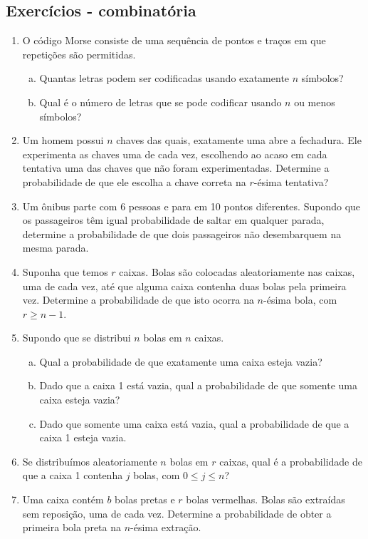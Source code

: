 \documentclass[../Notas.tex]{subfiles}
\begin{document}
\subsection{Exercícios - combinatória}

\begin{enumerate}
    \item O código Morse consiste de uma sequência de pontos e traços em que repetições são permitidas.
    \begin{enumerate}[a)]
    \item Quantas letras podem ser codificadas usando exatamente $n$ símbolos?
    \item Qual é o número de letras que se pode codificar usando $n$ ou menos símbolos?
    \end{enumerate}
    \item Um homem possui $n$ chaves das quais, exatamente uma abre a fechadura. Ele experimenta as chaves uma de cada vez, escolhendo ao acaso em cada tentativa uma das chaves que não foram experimentadas. Determine a probabilidade de que ele escolha a chave correta na $r$-ésima tentativa?
    \item Um ônibus parte com 6 pessoas e para em 10 pontos diferentes. Supondo que os passageiros têm igual probabilidade de saltar em qualquer parada, determine a probabilidade de que dois passageiros não desembarquem na mesma parada.
    \item Suponha que temos $r$ caixas. Bolas são colocadas aleatoriamente nas caixas, uma de cada vez, até que alguma caixa contenha duas bolas pela primeira vez. Determine a probabilidade de que isto ocorra na $n$-ésima bola, com $r \geq n - 1$.
    \item Supondo que se distribui $n$ bolas em $n$ caixas.
    \begin{enumerate}[a)]
    \item Qual a probabilidade de que exatamente uma caixa esteja vazia?
    \item Dado que a caixa 1 está vazia, qual a probabilidade de que somente uma caixa esteja vazia?
    \item Dado que somente uma caixa está vazia, qual a probabilidade de que a caixa 1 esteja vazia.    
    \end{enumerate}
    \item Se distribuímos aleatoriamente $n$ bolas em $r$ caixas, qual é a probabilidade de que a caixa 1 contenha $j$ bolas, com $0 \leq j \leq n$?
    \item Uma caixa contém $b$ bolas pretas e $r$ bolas vermelhas. Bolas são extraídas sem reposição, uma de cada vez. Determine a probabilidade de obter a primeira bola preta na $n$-ésima extração.

\end{enumerate}
\end{document}
